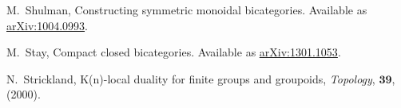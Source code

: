 \documentclass[11pt]{amsart}
\theoremstyle{remark}
\theoremstyle{definition}
\begin{document}
\begin{thebibliography}{100}
M.~Shulman, 
Constructing symmetric monoidal bicategories. 
Available as \href{http://arxiv.org/abs/1004.0993}{arXiv:1004.0993}.

 M.~Stay, 
Compact closed bicategories. 
Available as \href{http://arxiv.org/abs/1301.1053}{arXiv:1301.1053}.

N.\ Strickland,
K(n)-local duality for finite groups and groupoids,
\emph{Topology}, $\mathbf{39}$, (2000).

\end{thebibliography}


%
%
\end{document}
